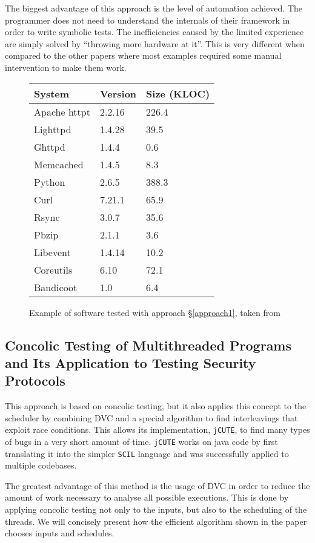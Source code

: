 \documentclass[10pt]{llncs}
\begin{document}
The biggest advantage of this approach is the level of automation achieved. The programmer does not need to understand the internals of their framework in order to write symbolic tests. The inefficiencies caused by the limited experience are simply solved by ``throwing more hardware at it''. This is very different when compared to the other papers where most examples required some manual intervention to make them work.

\begin{figure}
	\centering
	
	\begin{tabular}{l l l}
		System & Version & Size (KLOC) \\
		\hline
		Apache httpt & 2.2.16 & 226.4 \\
		Lighttpd & 1.4.28 & 39.5 \\
		Ghttpd & 1.4.4 & 0.6 \\
		Memcached & 1.4.5 & 8.3 \\
		Python & 2.6.5 & 388.3 \\
		Curl & 7.21.1 & 65.9 \\
		Rsync & 3.0.7 & 35.6 \\
		Pbzip & 2.1.1 & 3.6 \\
		Libevent & 1.4.14 & 10.2 \\
		Coreutils & 6.10 & 72.1 \\
		Bandicoot & 1.0 & 6.4
	\end{tabular}
	
	\caption{Example of software tested with approach §\ref{approach1}, taken from \cite{base3}}
	\label{example:3}
\end{figure}

\subsection{Concolic Testing of Multithreaded Programs and	Its Application to Testing Security Protocols \cite{base4}}
\label{jcute}
\label{approach2}

This approach is based on concolic testing, but it also applies this concept to the scheduler by combining DVC and a special algorithm to find interleavings that exploit race conditions. This allows its implementation, \texttt{jCUTE}, to find many types of bugs in a very short amount of time. \texttt{jCUTE} works on java code by first translating it into the simpler \texttt{SCIL} language and was successfully applied to multiple codebases.

The greatest advantage of this method is the usage of DVC in order to reduce the amount of work necessary to analyse all possible executions. This is done by applying concolic testing not only to the inputs, but also to the scheduling of the threads. We will concisely present how the efficient algorithm shown in the paper chooses inputs and schedules.
\end{document}
